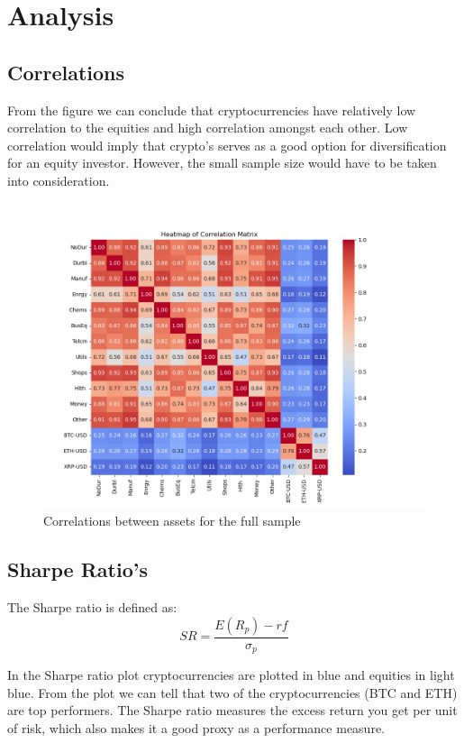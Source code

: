 \documentclass[12pt,a4paper]{article}
\begin{document}
\section{Analysis}\label{sec:analysis}
\subsection{Correlations}

From the figure we can conclude that cryptocurrencies have relatively low correlation to the equities and high correlation 
amongst each other. Low correlation would imply that crypto's serves as a good option for diversification for an equity 
investor. However, the small sample size would have to be taken into consideration. 
\begin{figure}[H]
    \centering
    \includegraphics[width=1\linewidth]{Figures/heatmap_correlation.png}
    \caption{Correlations between assets for the full sample}
    \label{fig:correlations}
\end{figure}

\subsection{Sharpe Ratio's}
The Sharpe ratio is defined as: 
$$SR = \frac{E(R_p)-rf}{\sigma_p}$$

\noindent In the Sharpe ratio plot cryptocurrencies are plotted in blue and equities in light blue. From the plot we can tell 
that two of the cryptocurrencies (BTC and ETH) are top performers. The Sharpe ratio measures the excess return you get per 
unit of risk, which also makes it a good proxy as a performance measure. 
\end{document}
